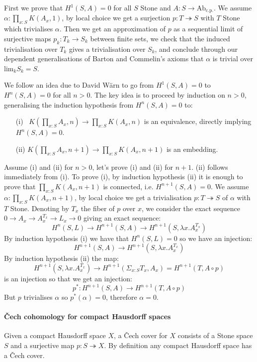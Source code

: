 \documentclass[letterpaper]{../util/easychair}
\begin{document}
First we prove that $H^1(S,A) = 0$ for all $S$ Stone and $A : S\to \mathrm{Ab}_{\mathrm{c.p.}}$. We assume $\alpha:\prod_{x:S}K(A_x,1)$, by local choice we get a surjection $p:T\twoheadrightarrow S$ with $T$ Stone which trivialises $\alpha$. Then we get an approximation of $p$ as a sequential limit of surjective maps $p_k:T_k\to S_k$ between finite sets, we check that the induced trivialisation over $T_k$ gives a trivialisation over $S_k$, and conclude through our dependent generalisations of Barton and Commelin's axioms that $\alpha$ is trivial over $\mathrm{lim}_kS_k =S$.

We follow an idea due to David W\"arn \cite[Theorem 3.4]{cech-draft} to go from $H^1(S,A)=0$ to $H^n(S,A)=0$ for all $n>0$. The key idea is to proceed by induction on $n>0$, generalising the induction hypothesis from $H^n(S,A) = 0$ to: 
\begin{itemize}
\item[(i)~] $ K(\prod_{x:S}A_x,n) \to \prod_{x:S}K(A_x,n)$ is an equivalence, directly implying $H^n(S,A)=0$.
\item[(ii)] $ K(\prod_{x:S}A_x,n+1) \to \prod_{x:S}K(A_x,n+1)$ is an embedding.
\end{itemize}
Assume (i) and (ii) for $n>0$, let's prove (i) and (ii) for $n+1$. (ii) follows immediately from (i). To prove (i), by induction hypothesis (ii) it is enough to prove that $\prod_{x:S}K(A_x,n+1)$ is connected, i.e. $H^{n+1}(S,A)=0$. We assume $\alpha:\prod_{x:S}K(A_x,n+1)$, by local choice we get a trivialisation $p:T\twoheadrightarrow S$ of $\alpha$ with $T$ Stone. Denoting by $T_x$ the fiber of $p$ over $x$, we consider the exact sequence $0\to A_x\to A_x^{T_x}\to L_x\to 0$ giving an exact sequence:
\[H^{n}(S,L)\to H^{n+1}(S,A)\to H^{n+1}(S,\lambda x. A_x^{T_x})\]
By induction hypothesis (i) we have that $H^{n}(S,L) = 0$ so we have an injection:
\[H^{n+1}(S,A)\to H^{n+1}(S,\lambda x. A_x^{T_x})\]
By induction hypothesis (ii) the map: 
\[H^{n+1}(S,\lambda x. A_x^{T_x}) \to H^{n+1}(\Sigma_{x:S}T_x,A_x) = H^{n+1}(T,A\circ p)\]
is an injection so that we get an injection:
\[p^* : H^{n+1}(S,A)\to H^{n+1}(T,A\circ p)\] 
But $p$ trivialises $\alpha$ so $p^*(\alpha)=0$, therefore $\alpha=0$.

\paragraph*{\v{C}ech cohomology for compact Hausdorff spaces}

Given a compact Hausdorff space $X$, a \v{C}ech cover for $X$ consists of a Stone space $S$ and a surjective map $p:S\twoheadrightarrow X$. By definition any compact Hausdorff space has a \v{C}ech cover.
\end{document}
